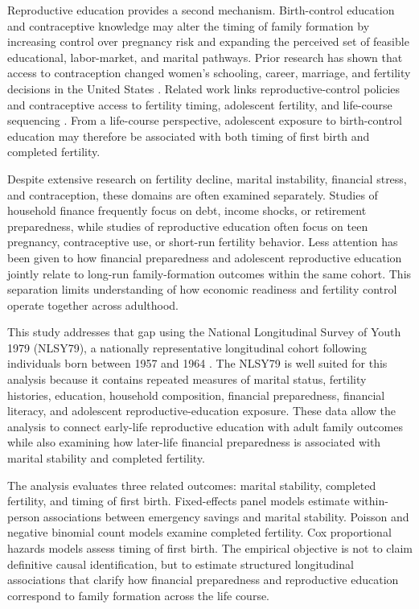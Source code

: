 \documentclass[12pt]{article}
\begin{document}
Reproductive education provides a second mechanism. Birth-control education and contraceptive knowledge may alter the timing of family formation by increasing control over pregnancy risk and expanding the perceived set of feasible educational, labor-market, and marital pathways. Prior research has shown that access to contraception changed women's schooling, career, marriage, and fertility decisions in the United States \citep{goldin2002,bailey2010}. Related work links reproductive-control policies and contraceptive access to fertility timing, adolescent fertility, and life-course sequencing \citep{kearney2009,lindberg2016,myers2017}. From a life-course perspective, adolescent exposure to birth-control education may therefore be associated with both timing of first birth and completed fertility.

Despite extensive research on fertility decline, marital instability, financial stress, and contraception, these domains are often examined separately. Studies of household finance frequently focus on debt, income shocks, or retirement preparedness, while studies of reproductive education often focus on teen pregnancy, contraceptive use, or short-run fertility behavior. Less attention has been given to how financial preparedness and adolescent reproductive education jointly relate to long-run family-formation outcomes within the same cohort. This separation limits understanding of how economic readiness and fertility control operate together across adulthood.

This study addresses that gap using the National Longitudinal Survey of Youth 1979 (NLSY79), a nationally representative longitudinal cohort following individuals born between 1957 and 1964 \citep{bls2025nlsy79,nlsinfo2026nlsy79}. The NLSY79 is well suited for this analysis because it contains repeated measures of marital status, fertility histories, education, household composition, financial preparedness, financial literacy, and adolescent reproductive-education exposure. These data allow the analysis to connect early-life reproductive education with adult family outcomes while also examining how later-life financial preparedness is associated with marital stability and completed fertility.

The analysis evaluates three related outcomes: marital stability, completed fertility, and timing of first birth. Fixed-effects panel models estimate within-person associations between emergency savings and marital stability. Poisson and negative binomial count models examine completed fertility. Cox proportional hazards models assess timing of first birth. The empirical objective is not to claim definitive causal identification, but to estimate structured longitudinal associations that clarify how financial preparedness and reproductive education correspond to family formation across the life course.
\end{document}
